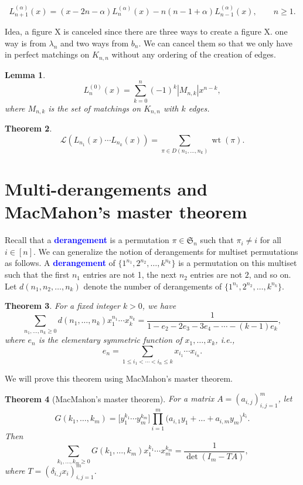 \documentclass[oneside]{book}
\numberwithin{equation}{section}
\newtheorem{thm}{Theorem}[section]
\newtheorem{lem}[thm]{Lemma}
\theoremstyle{definition}
\newcommand\sym{\mathfrak{S}}
\newcommand\LL{\mathcal{L}}
\newcommand\wt{\operatorname{wt}}
\renewcommand\emph[1]{\textcolor{blue}{\bf #1}}
\begin{document}
\[
  L^{(\alpha)}_{n+1}(x) = (x-2n-\alpha) L^{(\alpha)}_n(x) - n(n-1+\alpha) L^{(\alpha)}_{n-1}(x), \qquad n\ge1.
\]

Idea, a figure X is canceled since
there are three ways to create a figure X.
one way is from \( \lambda_n \)
and two ways from \( b_n \).
We can cancel them so that we only
have in perfect matchings on \( K_{n,n} \)
without any ordering of the creation of edges.

\begin{lem}
  \[
    L^{(0)}_{n}(x)
    = \sum_{k=0}^{n} (-1)^{k} |M_{n,k}|x^{n-k},
  \]
  where \( M_{n,k} \) is the set of matchings on \( K_{n,n} \) with
  \( k \) edges.
\end{lem}



\begin{thm}
\[
  \LL(L_{n_1}(x)\cdots L_{n_k}(x))
  = \sum_{\pi \in D(n_1,\dots,n_k)} \wt(\pi).
\]
\end{thm}

\section{Multi-derangements and MacMahon's master theorem}
\label{sec:enumeration}

Recall that a \emph{derangement} is a permutation \( \pi\in \sym_n \)
such that \( \pi_i\ne i \) for all \( i\in [n] \). We can generalize
the notion of derangements for multiset permutations as follows. A
\emph{derangement} of $\{1^{n_1}, 2^{n_2},\dots,k^{n_k}\}$ is a
permutation on this multiset such that the first $n_1$ entries are not
1, the next $n_2$ entries are not $2$, and so on. Let
$d(n_1,n_2,\dots,n_k)$ denote the number of derangements of
$\{1^{n_1}, 2^{n_2},\dots,k^{n_k}\}$.

\begin{thm}
For a fixed integer \( k>0 \), we have
  \[
\sum_{n_1,\dots,n_k\geq0} d(n_1,\dots,n_k) x_1^{n_1} \cdots x_k^{n_k}
= \frac{1}{1-e_2-2e_3-3e_4-\cdots-(k-1)e_k},
\]
where
$e_n$ is the elementary symmetric function of $x_1,\dots,x_k$, i.e.,
\[
e_n = \sum_{1\leq i_1<\cdots<i_n\leq k} x_{i_1}\cdots x_{i_n}.
\]
\end{thm}

We will prove this theorem using MacMahon's master theorem.


\begin{thm}[MacMahon's master theorem]
  \label{thm:MMT}
  For a matrix \( A = (a_{i,j})_{i,j=1}^m \), let
\[
  G(k_1,\dots,k_m)  =  \bigl[y_1^{k_1}\cdots y_m^{k_m}\bigr] 
\prod_{i=1}^m \bigl(a_{i,1}y_1 + \dots + a_{i,m}y_m \bigl)^{k_i}.
\]
Then
\[
  \sum _{k_{1},\dots ,k_{m}\ge 0}G(k_{1},\dots ,k_{m})x_{1}^{k_{1}}\cdots x_{m}^{k_{m}}
  ={\frac {1}{\det(I_{m}-TA)}},
\]
where \( T = (\delta_{i,j}x_i)_{i,j=1}^m \).
\end{thm}
\end{document}
